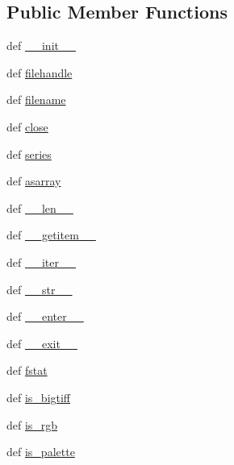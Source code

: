 \subsection*{Public Member Functions}
\begin{DoxyCompactItemize}
\item 
def \hyperlink{classtifffile_1_1_tiff_file_a2cacc91d936a85b866629e1004db56be}{\-\_\-\-\_\-init\-\_\-\-\_\-}
\item 
def \hyperlink{classtifffile_1_1_tiff_file_ab60b7755da796bc24e0959901a2178f2}{filehandle}
\item 
def \hyperlink{classtifffile_1_1_tiff_file_a6215683006e55ed5602df52a5596b6c2}{filename}
\item 
def \hyperlink{classtifffile_1_1_tiff_file_aeee11d1813bfd5ca6684468bb771f214}{close}
\item 
def \hyperlink{classtifffile_1_1_tiff_file_a774e670bd07b1bfc5f06ccd52a6a800a}{series}
\item 
def \hyperlink{classtifffile_1_1_tiff_file_a6ffb819278ba899e42fd6253508bcb8a}{asarray}
\item 
def \hyperlink{classtifffile_1_1_tiff_file_a9e400571d3475d5e268893877136bf24}{\-\_\-\-\_\-len\-\_\-\-\_\-}
\item 
def \hyperlink{classtifffile_1_1_tiff_file_addf7084c3ea60f31fa8f19b4db5284a4}{\-\_\-\-\_\-getitem\-\_\-\-\_\-}
\item 
def \hyperlink{classtifffile_1_1_tiff_file_a12847e8b06cb8c2c4b9233377eaec539}{\-\_\-\-\_\-iter\-\_\-\-\_\-}
\item 
def \hyperlink{classtifffile_1_1_tiff_file_a090018b858ceac412aafeae6c6c29a89}{\-\_\-\-\_\-str\-\_\-\-\_\-}
\item 
def \hyperlink{classtifffile_1_1_tiff_file_a8af0d38a6308893259f009a848dc8f55}{\-\_\-\-\_\-enter\-\_\-\-\_\-}
\item 
def \hyperlink{classtifffile_1_1_tiff_file_a86dacb85206d356ff3da93bec1ed0848}{\-\_\-\-\_\-exit\-\_\-\-\_\-}
\item 
def \hyperlink{classtifffile_1_1_tiff_file_a930a149ecaf1ad9409c4dbad1d9c2d60}{fstat}
\item 
def \hyperlink{classtifffile_1_1_tiff_file_af5d955e517896fee54d9fe3d9e9f266c}{is\-\_\-bigtiff}
\item 
def \hyperlink{classtifffile_1_1_tiff_file_a633ef6274a2c54e1af3f1e01c9e6ee66}{is\-\_\-rgb}
\item 
def \hyperlink{classtifffile_1_1_tiff_file_a610addce1bfe1fe31aed918f358bdeaf}{is\-\_\-palette}
\item 

\end{DoxyCompactItemize}
